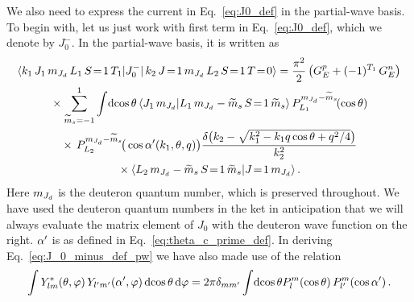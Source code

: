	We also need to express the current in Eq.~\eqref{eq:J0_def} in the
	partial-wave basis.  To begin with, let us just work with first term in
	Eq.~\eqref{eq:J0_def}, which we denote by $J_0 ^-$.  In the partial-wave
	basis, it is written as
	\begin{multline}
	 \mbraket{k_1 \, J_1 \, \mJd \, L_1 \, S\!=\!1 \, T_1}{J_0^{-}}
	 {\,k_2 \, J\!=\!1 \, \mJd \, L_2 \, S\!=\!1 \, T\!=\!0}
	 = \frac{\pi^2}{2} \, \big(G_E ^p + (-1)^{T_1} \, G_E^n\big) \\
	 \null \times \sum_{\widetilde{m}_s = -1}^1 \int\!\dcostheta
	 \, \braket{J_1 \, \mJd}{L_1 \, \mJd - \wt{m}_s \, S\!=\!1 \,\wt{m}_s}
	 \,P_{L_1}^{\mJd - \widetilde{m}_s}\!(\cos\theta) \\
	 \null \times
	 \,P_{L_2}^{\mJd - \widetilde{m}_s}\!\big(\cos\thetacprime(k_1, \theta, q)
	 \big) \frac{\delta\big(k_2-\sqrt{k_1^2-k_1 q \cos\theta + q^2/4}\big)}
	 {k_2^2} \\
	 \null \times
	 \CG{L_2}{\mJd - \widetilde{m}_s}{S\!=\!1}{\widetilde{m}_s}{J\!=\!1}{\mJd} \,.
	\label{eq:J_0_minus_def_pw}
	\end{multline}
	Here $m_{J_d}$ is the deuteron quantum number, which is preserved throughout.
	We have used the deuteron quantum numbers in the ket in anticipation
	that we will always evaluate the matrix element of $J_0$ with the deuteron
	wave function on the right.   $\alpha^\prime$ is as defined in
	Eq.~\eqref{eq:theta_c_prime_def}.  In deriving Eq.~\eqref{eq:J_0_minus_def_pw}
	we have also made use of the relation \cite{Jerry_thesis}
	\begin{equation}
	 \int Y_{lm} ^\ast(\theta, \varphi) \,
	 Y_{l^\prime m^\prime}(\alpha^\prime,\varphi)
	 \,\mathrm{d}\!\cos \theta \, \mathrm{d} \varphi
	 = 2\pi \delta_{m m^\prime}
	 \int\!\mathrm{d} \! \cos \theta
	 P_l^m(\cos\theta) \, P_{l^\prime}^m(\cos \alpha^\prime) \,.
	\end{equation}

